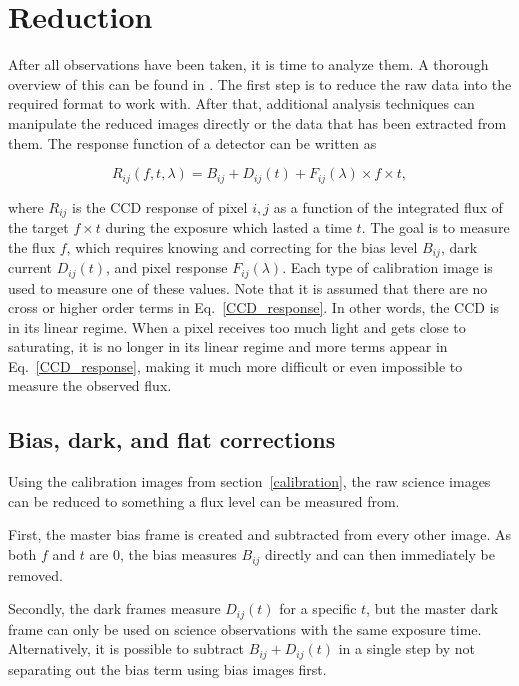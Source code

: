 \documentclass[a4paper,oneside,12pt, class=Latex/Classes/PhDthesisPSnPDF, crop=false]{standalone}
\begin{document}
\section{Reduction}
\label{reduction}
After all observations have been taken, it is time to analyze them. A thorough overview of this can be found in \citet{Image_processing}. The first step is to reduce the raw data into the required format to work with. After that, additional analysis techniques can manipulate the reduced images directly or the data that has been extracted from them. The response function of a detector can be written as

\begin{equation}
	R_{ij}(f, t, \lambda) = B_{ij} + D_{ij}(t) + F_{ij}(\lambda) \times f \times t,
	\label{CCD_response}
\end{equation}

where $R_{ij}$ is the CCD response of pixel $i,j$ as a function of the integrated flux of the target $f \times t$ during the exposure which lasted a time $t$. The goal is to measure the flux $f$, which requires knowing and correcting for the bias level $B_{ij}$, dark current $D_{ij}(t)$, and pixel response $F_{ij}(\lambda)$. Each type of calibration image is used to measure one of these values. Note that it is assumed that there are no cross or higher order terms in Eq.~\ref{CCD_response}. In other words, the CCD is in its linear regime. When a pixel receives too much light and gets close to saturating, it is no longer in its linear regime and more terms appear in Eq.~\ref{CCD_response}, making it much more difficult or even impossible to measure the observed flux.


\subsection{Bias, dark, and flat corrections}
Using the calibration images from section~\ref{calibration}, the raw science images can be reduced to something a flux level can be measured from. 

First, the master bias frame is created and subtracted from every other image. As both $f$ and $t$ are 0, the bias measures $B_{ij}$ directly and can then immediately be removed.

Secondly, the dark frames measure $D_{ij}(t)$ for a specific $t$, but the master dark frame  can only be used on science observations with the same exposure time. Alternatively, it is possible to subtract $B_{ij} + D_{ij}(t)$ in a single step by not separating out the bias term using bias images first.
\end{document}
